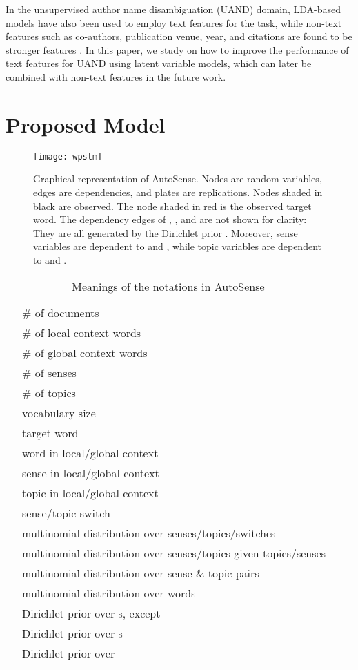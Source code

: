 \documentclass[letterpaper]{article} \usepackage{aaai19}
\begin{document}
In the unsupervised author name disambiguation (UAND) domain, LDA-based models have also been used \cite{shu2009latent} to employ text features for the task, while non-text features such as co-authors, publication venue, year, and citations are found to be stronger features \cite{tang2012unified}. In this paper, we study on how to improve the performance of text features for UAND using latent variable models, which can later be combined with non-text features in the future work.

\section{Proposed Model}
\begin{figure}[t]
    \centering
    \texttt{[image: wpstm]}
    \caption{Graphical representation of AutoSense. Nodes are random variables, edges are dependencies, and plates are replications. Nodes shaded in black are observed. The node shaded in red is the observed target word. The dependency edges of , , and  are not shown for clarity: They are all generated by the Dirichlet prior . Moreover, sense variables are dependent to  and , while topic variables are dependent to  and .}
    \label{fig:condsptm}
\end{figure}
\begin{table}[t]
    \scriptsize
    \centering
    \begin{tabularx}{0.47\textwidth}{|cX|}
        \hline
         & \# of documents \\
         & \# of local context words \\
         & \# of global context words \\
         & \# of senses \\
         & \# of topics \\
         & vocabulary size \\
         & target word \\
         & word in local/global context \\
         & sense in local/global context \\
         & topic in local/global context \\
         & sense/topic switch \\
         & multinomial distribution over senses/topics/switches \\
         & multinomial distribution over senses/topics given topics/senses \\
         & multinomial distribution over sense \& topic pairs \\
         & multinomial distribution over words \\
         & Dirichlet prior over s, except  \\
         & Dirichlet prior over s \\
         & Dirichlet prior over  \\
        \hline
    \end{tabularx}
    \caption{Meanings of the notations in AutoSense}
    \label{tab:notations}
\end{table}
\end{document}
